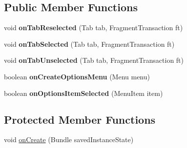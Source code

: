 \subsection*{Public Member Functions}
\begin{DoxyCompactItemize}
\item 
\hypertarget{classcom_1_1lakehead_1_1textbookmarket_1_1_main_activity_ab157c4c64c3d3df2ca8037a97eb396ab}{void {\bfseries on\-Tab\-Reselected} (Tab tab, Fragment\-Transaction ft)}\label{classcom_1_1lakehead_1_1textbookmarket_1_1_main_activity_ab157c4c64c3d3df2ca8037a97eb396ab}

\item 
\hypertarget{classcom_1_1lakehead_1_1textbookmarket_1_1_main_activity_a8304b9234b265c96b74b222be4ec53e2}{void {\bfseries on\-Tab\-Selected} (Tab tab, Fragment\-Transaction ft)}\label{classcom_1_1lakehead_1_1textbookmarket_1_1_main_activity_a8304b9234b265c96b74b222be4ec53e2}

\item 
\hypertarget{classcom_1_1lakehead_1_1textbookmarket_1_1_main_activity_aafe36df32532d34dd53f425c330d192f}{void {\bfseries on\-Tab\-Unselected} (Tab tab, Fragment\-Transaction ft)}\label{classcom_1_1lakehead_1_1textbookmarket_1_1_main_activity_aafe36df32532d34dd53f425c330d192f}

\item 
\hypertarget{classcom_1_1lakehead_1_1textbookmarket_1_1_main_activity_a42aad44340fa4dd995cca807512be2bf}{boolean {\bfseries on\-Create\-Options\-Menu} (Menu menu)}\label{classcom_1_1lakehead_1_1textbookmarket_1_1_main_activity_a42aad44340fa4dd995cca807512be2bf}

\item 
\hypertarget{classcom_1_1lakehead_1_1textbookmarket_1_1_main_activity_a9e9ecfdbbbb7ad1d0ecec7ba405701a6}{boolean {\bfseries on\-Options\-Item\-Selected} (Menu\-Item item)}\label{classcom_1_1lakehead_1_1textbookmarket_1_1_main_activity_a9e9ecfdbbbb7ad1d0ecec7ba405701a6}

\end{DoxyCompactItemize}
\subsection*{Protected Member Functions}
\begin{DoxyCompactItemize}
\item 
void \hyperlink{classcom_1_1lakehead_1_1textbookmarket_1_1_main_activity_ab5dc3cecf5c66f0c5e7ab996b6143fe4}{on\-Create} (Bundle saved\-Instance\-State)
\end{DoxyCompactItemize}


